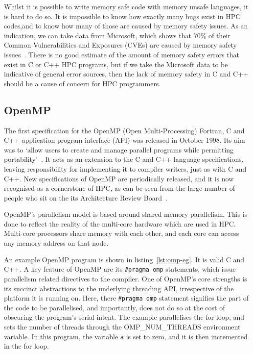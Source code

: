 Whilst it is possible to write memory safe code with memory unsafe languages, it is hard to do so. It is impossible to know how exactly many bugs exist in HPC codes,and to know how many of those are caused by memory safety issues.
As an indication, we can take data from Microsoft, which shows that 70\% of their Common Vulnerabilities and Exposures (CVEs) are caused by memory safety issues~\cite{MicroBugs}. There is no good estimate of the amount of memory safety errors that exist in C or C++ HPC programs, but if we take the Microsoft data to be indicative of general error sources, then the lack of memory safety in C and C++ should be a cause of concern for HPC programmers.

\subsection{OpenMP}
The first specification for the OpenMP (Open Multi-Processing) Fortran, C and C++ application program interface (API) was released in October 1998. Its aim was to `allow users to create and manage parallel programs while permitting portability'~\cite{OpenMPSpec}. It acts as an extension to the C and C++ language specifications, leaving responsibility for implementing it to compiler writers, just as with C and C++. New specifications of OpenMP are periodically released, and it is now recognised as a cornerstone of HPC, as can be seen from the large number of people who sit on the its Architecture Review Board~\cite{OpenMPARB}.

OpenMP's parallelism model is based around shared memory parallelism. This is done to reflect the reality of the multi-core hardware which are used in HPC\@. Multi-core processors share memory with each other, and each core can access any memory address on that node.  

An example OpenMP program is shown in listing~\ref{lst:omp-eg}. It is valid C and C++. A key feature of OpenMP are its \texttt{\#pragma omp} statements, which issue parallelism related directives to the compiler. 
One of OpenMP's core strengths is its succinct abstractions to the underlying threading API, irrespective of the platform it is running on. Here, there \texttt{\#pragma omp} statement signifies the part of the code to be parallelised, and importantly, does not do so at the cost of obscuring the program's serial intent.
The example parallelises the for loop, and sets the number of threads through the OMP\_NUM\_THREADS environment variable. In this program, the variable \texttt{a} is set to zero, and it is then incremented in the for loop.

